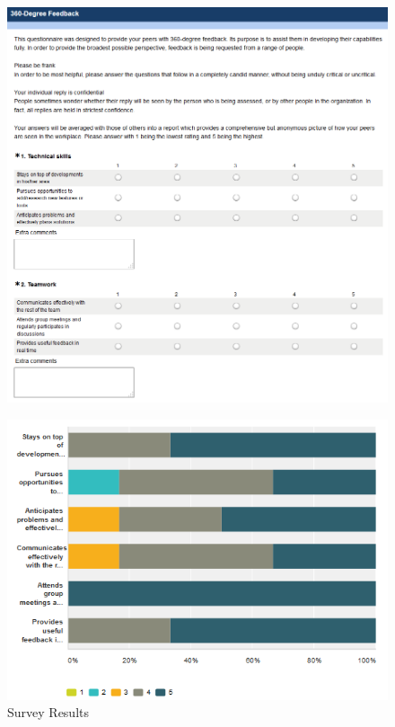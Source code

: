 \documentclass[10pt, a4paper]{article}
\begin{document}
\begin{figure}[h]
        \centering
        \includegraphics[scale=0.5]{images/evaluation/360_feedback.png}
\end{figure}

\begin{figure}
        \centering
        \includegraphics[scale=0.5]{images/evaluation/survey.png}
        \caption{Survey Results}
\end{figure}
\end{document}
